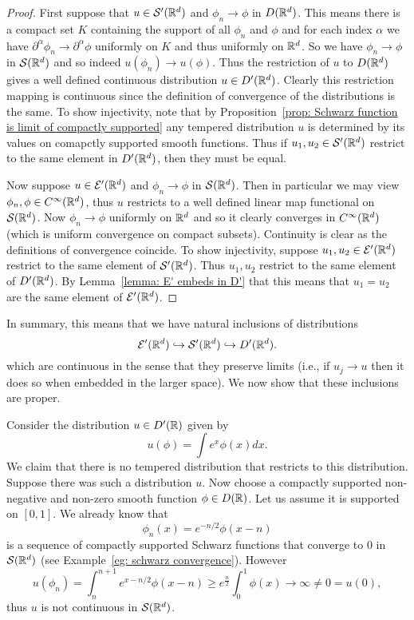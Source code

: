 \documentclass[twoside, a4paper, 10pt]{amsart}
\begin{document}
\begin{proof} 

First suppose that $u \in \mathcal{S}'(\mathbb{R}^d)$ and $\phi_n \to \phi$ in $D(\mathbb{R}^d)$. This means there is a compact set $K$ containing the support of all $\phi_n$ and $\phi$ and for each index $\alpha$ we have $ \partial^{\alpha} \phi_n \to \partial^{\alpha} \phi$ uniformly on $K$ and thus uniformly on $\mathbb{R}^d$. So we have $\phi_n \to \phi$ in $\mathcal{S}(\mathbb{R}^d)$ and so indeed $u(\phi_n) \to u(\phi)$. Thus the restriction of $u$ to $D(\mathbb{R}^d)$ gives a well defined continuous distribution $u \in D'(\mathbb{R}^d)$. Clearly this restriction mapping is continuous since the definition of convergence of the distributions is the same. To show injectivity, note that by Proposition~\ref{prop: Schwarz function is limit of compactly supported} any tempered distribution $u$ is determined by its values on comapctly supported smooth functions. Thus if $u_1,u_2 \in \mathcal{S}'(\mathbb{R}^d)$ restrict to the same element in $D'(\mathbb{R}^d)$, then they must be equal.

Now suppose $u \in \mathcal{E}'(\mathbb{R}^d)$ and $\phi_n \to \phi$ in $\mathcal{S}(\mathbb{R}^d)$. Then in particular we may view $\phi_n, \phi \in C^{\infty}(\mathbb{R}^d)$, thus $u$ restricts to a well defined linear map functional on $\mathcal{S}(\mathbb{R}^d)$. Now $\phi_n \to \phi$ uniformly on $\mathbb{R}^d$ and so it clearly converges in $C^{\infty}(\mathbb{R}^d)$ (which is uniform convergence on compact subsets). Continuity is clear as the definitions of convergence coincide. To show injectivity, suppose $u_1,u_2 \in \mathcal{E}'(\mathbb{R}^d)$ restrict to the same element of $\mathcal{S}'(\mathbb{R}^d)$. Thus $u_1,u_2$ restrict to the same element of $D'(\mathbb{R}^d)$. By Lemma~\ref{lemma: E' embeds in D'} that this means that $u_1 = u_2$ are the same element of $\mathcal{E}'(\mathbb{R}^d)$.

\end{proof}

In summary, this means that we have natural inclusions of distributions $$\mathcal{E}'(\mathbb{R}^d) \hookrightarrow \mathcal{S}'(\mathbb{R}^d) \hookrightarrow D'(\mathbb{R}^d).$$ which are continuous in the sense that they preserve limits (i.e., if $u_j \to u$ then it does so when embedded in the larger space). We now show that these inclusions are proper.

\begin{eg} Consider the distribution $u \in D'(\mathbb{R})$ given by $$u(\phi) = \int e^x \phi(x) dx.$$ We claim that there is no tempered distribution that restricts to this distribution. Suppose there was such a distribution $u$. Now choose a compactly supported non-negative and non-zero smooth function $\phi \in D(\mathbb{R})$. Let us assume it is supported on $[0,1]$. We already know that $$\phi_n(x) = e^{-n/2}\phi(x-n)$$ is a sequence of compactly supported Schwarz functions that converge to $0$ in $\mathcal{S}(\mathbb{R}^d)$ (see Example~\ref{eg: schwarz convergence}). However $$u(\phi_n) = \int_{n}^{n+1} e^{x - n/2} \phi(x-n) \geq e^{\frac{n}{2}} \int_0^1 \phi(x) \to \infty \neq 0 = u(0),$$ thus $u$ is not continuous in $\mathcal{S}(\mathbb{R}^d)$.

\end{eg}
\end{document}
